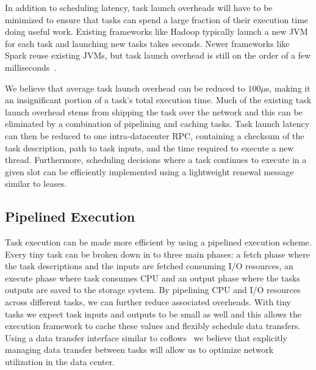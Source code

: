 In addition to scheduling latency, task launch overheads will have to be
minimized to ensure that tasks can spend a large fraction of their execution
time doing useful work. Existing frameworks like Hadoop typically launch a new
JVM for each task and launching new tasks takes  seconds. Newer
frameworks like Spark reuse existing JVMs, but task launch overhead is still on
the order of a few milliseconds~\cite{sparrow}.

We believe that average task launch overhead can be reduced to $100 \mu$s, making it
an insignificant portion of a task's total execution time. 
Much of the existing task launch
overhead stems from shipping the task over the network and this can be
eliminated by a combination of pipelining and caching tasks.
Task launch latency can then be reduced to one
intra-datacenter RPC, containing a checksum of the task description, path to
task inputs, and the time required to execute a new thread. Furthermore, 
scheduling decisions where a task continues to execute in a given slot can be 
efficiently implemented using a lightweight renewal message similar to leases.

\subsection{Pipelined Execution}
\label{sec:pipeline}
Task execution can be made more efficient by using a pipelined execution scheme.
Every tiny task can be broken down in to three main phases: a fetch phase where
the task descriptions and the inputs are fetched consuming I/O resources, an
execute phase where task consumes CPU and an output phase where the tasks
outputs are saved to the storage system. By pipelining CPU and I/O resources
across different tasks, we can further reduce associated overheads. With tiny
tasks we expect task inputs and outputs to be small as well and this allows the
execution framework to cache these values and flexibly schedule data transfers.
Using a data transfer interface similar to coflows~\cite{coflow-hotnets} we
believe that explicitly managing data transfer between tasks will allow us to
optimize network utilization in the data center.

